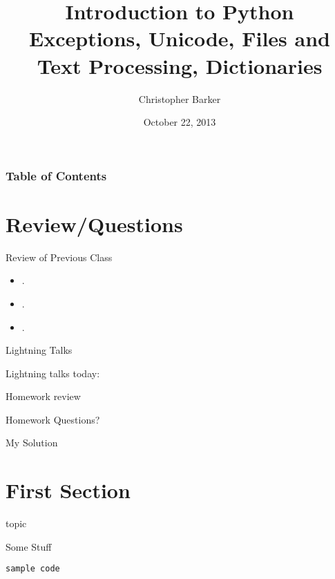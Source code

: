 \documentclass{beamer}
\title[Intro to Python: Week 4]{Introduction  to Python\\ Exceptions, Unicode, Files and Text Processing, Dictionaries}
\author{Christopher Barker}
\institute{UW Continuing Education}
\date{October 22, 2013}
\begin{document}
\begin{frame}
  \titlepage
\end{frame}

\begin{frame}
\frametitle{Table of Contents}
  \tableofcontents
\end{frame}


\section{Review/Questions}

\begin{frame}{Review of Previous Class}

\begin{itemize}
  \item .
  \item .
  \item .
\end{itemize}

\end{frame}


\begin{frame}{Lightning Talks}

\vfill
{\LARGE Lightning talks today:}

\vfill
{\Large
 

\vfill

\vfill

\vfill

}
\vfill

\end{frame}


\begin{frame}{Homework review}

  \vfill
  {\Large Homework Questions? }

  \vfill
  {\Large My Solution}

  \vfill

\end{frame}

\section{First Section}

\begin{frame}[fragile]{topic}

{\Large Some Stuff}

\begin{verbatim}
sample code
\end{verbatim}


\end{frame}
\end{document}
